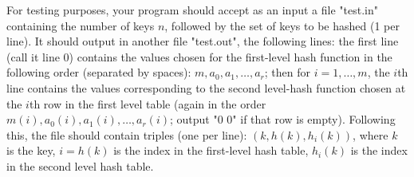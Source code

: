 \documentclass{article}
\begin{document}
For testing purposes, your program  should accept as an input a file
"test.in" containing the number of keys $n$, followed by the set of
keys to be hashed (1 per line). It should output in another file
"test.out", the following lines: the first line (call it line 0)
contains the values chosen for the first-level hash function in the
following order (separated by spaces): $m, a_0,a_1,\ldots,a_r$; then
for $i=1,\ldots,m$, the $i$th line contains the values corresponding
to the second level-hash function chosen at the $i$th row in the first
level table (again in the order $m(i), a_0(i),a_1(i),\ldots,a_r(i)$;
output "0 0" if that row is empty). Following this, the file should
contain triples (one per line): $(k,h(k),h_i(k))$, where $k$ is the
key, $i=h(k)$ is the index in the first-level hash table, $h_i(k)$ is
the index in the second level hash table. 
\end{document}
